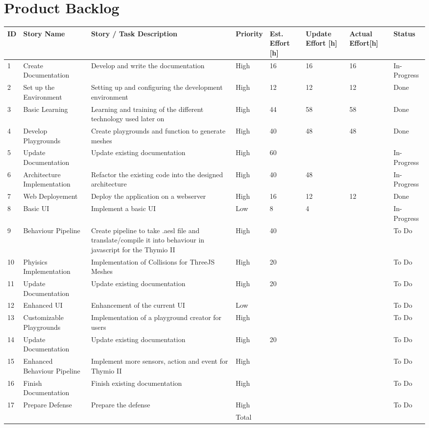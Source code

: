 \documentclass{scrbook}
\begin{document}
\chapter{Product Backlog}
\begin{longtable}{p{5mm}|p{2cm}|p{4cm}|p{1cm}|p{1cm}|p{1cm}|p{1cm}|p{15mm}}
  ID                     & Story Name & Story / Task Description & Priority & Est. Effort {[}h{]} & Update Effort {[}h{]} & Actual Effort{[}h{]} & Status                \\ \hline
  1 & Create Documentation & Develop and write the documentation & High & 16 & 16 & 16 & In-Progress \\ 
  2 & Set up the Environment & Setting up and configuring the development environment & High & 12 & 12 & 12 & Done \\ 
  3 & Basic Learning & Learning and training of the different technology used later on & High & 44 & 58 & 58 & Done \\ 
  4 & Develop Playgrounds & Create playgrounds and function to generate meshes & High & 40 & 48 & 48 & Done \\ 
  5 & Update Documentation & Update existing documentation & High & 60 &  &  & In-Progress \\
  6 & Architecture Implementation & Refactor the existing code into the designed architecture & High & 40 & 48 &  & In-Progress\\ 
  7 & Web Deployement & Deploy the application on a webserver & High & 16 & 12 & 12 & Done \\ 
  8 & Basic UI & Implement a basic UI & Low & 8 & 4 &  & In-Progress \\ 
  9 & Behaviour Pipeline & Create pipeline to take .aesl file and translate/compile it into behaviour in javascript for the Thymio II & High & 40 &  &  & To Do \\ 
  10 & Phyisics Implementation & Implementation of Collisions for ThreeJS Meshes & High & 20 &  &  & To Do \\ 
  11 & Update Documentation & Update existing documentation & High & 20 &  &  & To Do \\ 
  12 & Enhanced UI & Enhancement of the current UI & Low &  &  &  & To Do \\ 
  13 & Customizable Playgrounds & Implementation of a playground creator for users & High &  &  &  & To Do \\ 
  14 & Update Documentation & Update existing documentation & High & 20 &  &  & To Do \\ 
  15 & Enhanced Behaviour Pipeline & Implement more sensors, action and event for Thymio II & High &  &  &  & To Do \\ 
  16 & Finish Documentation & Finish existing documentation & High &  &  &  & To Do \\
  17 & Prepare Defense & Prepare the defense & High &  &  &  & To Do \\ 
   &  &  & Total &  &  &  &  \\ 
\end{longtable}
\end{document}
